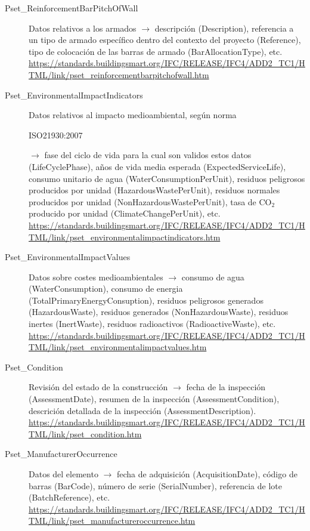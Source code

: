 \documentclass[spanish,12pt,a4paper,final,oneside]{book}
\begin{document}
\begin{description}
\item[Pset\_ReinforcementBarPitchOfWall] Datos relativos a los armados $\rightarrow$ descripción (Description), referencia a un tipo de armado específico dentro del contexto del proyecto (Reference), tipo de colocación de las barras de armado (BarAllocationType), etc.
\\ \url{https://standards.buildingsmart.org/IFC/RELEASE/IFC4/ADD2_TC1/HTML/link/pset_reinforcementbarpitchofwall.htm}

\item[Pset\_EnvironmentalImpactIndicators] Datos relativos al impacto medioambiental, según norma \begin{footnotesize} ISO21930:2007\end{footnotesize} $\rightarrow$ fase del ciclo de vida para la cual son validos estos datos (LifeCyclePhase), años de vida media esperada (ExpectedServiceLife), consumo unitario de agua (WaterConsumptionPerUnit), residuos peligrosos producidos por unidad (HazardousWastePerUnit), residuos normales producidos por unidad (NonHazardousWastePerUnit), tasa de CO$_{2}$ producido por unidad (ClimateChangePerUnit), etc.
\\ \url{https://standards.buildingsmart.org/IFC/RELEASE/IFC4/ADD2_TC1/HTML/link/pset_environmentalimpactindicators.htm}

\item[Pset\_EnvironmentalImpactValues] Datos sobre costes medioambientales $\rightarrow$ consumo de agua (WaterConsumption), consumo de energia (TotalPrimaryEnergyConsuption), residuos peligrosos generados (HazardousWaste), residuos generados (NonHazardousWaste), residuos inertes (InertWaste), residuos radioactivos (RadioactiveWaste), etc.
\\ \url{https://standards.buildingsmart.org/IFC/RELEASE/IFC4/ADD2_TC1/HTML/link/pset_environmentalimpactvalues.htm}

\item[Pset\_Condition] Revisión del estado de la construcción $\rightarrow$ fecha de la inspección (AssessmentDate), resumen de la inspección (AssessmentCondition), descrición detallada de la inspección (AssessmentDescription).
\\ \url{https://standards.buildingsmart.org/IFC/RELEASE/IFC4/ADD2_TC1/HTML/link/pset_condition.htm}

\item[Pset\_ManufacturerOccurrence] Datos del elemento $\rightarrow$ fecha de adquisición (AcquisitionDate), código de barras (BarCode), número de serie (SerialNumber), referencia de lote (BatchReference), etc.
\\ \url{https://standards.buildingsmart.org/IFC/RELEASE/IFC4/ADD2_TC1/HTML/link/pset_manufactureroccurrence.htm}


\end{description}
\end{document}
